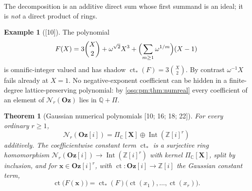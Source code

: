\documentclass[11pt,letterpaper]{article}
\numberwithin{equation}{section}
\newtheorem{theorem}{Theorem}[section]
\theoremstyle{definition}
\newtheorem{example}[example]{Example}
\theoremstyle{remark}
\theoremstyle{plain}
\newcommand{\Oz}{\mathbf{Oz}}
\newcommand{\GOz}{\Oz[i]}
\newcommand{\Z}{\mathbb Z}
\newcommand{\Q}{\mathbb Q}
\newcommand{\C}{\mathbb C}
\newcommand{\ct}{\operatorname{ct}}
\newcommand{\Int}{\operatorname{Int}}
\newcommand{\Num}{\mathscr N}
\newcommand{\src}[1]{\textup{\textsf{[#1]}}}
\begin{document}
The decomposition is an additive direct sum whose first summand is an ideal; it is
\emph{not} a direct product of rings.

\begin{example}[\src{10}]\label{osq:pm:ex:numreal}
The polynomial
\[
 F(X)=3\binom X2+\omega^{\sqrt2}X^3+\Bigl(\sum_{m\ge1}\omega^{1/m}\Bigr)(X-1)
\]
is omnific-integer valued and has shadow $\ct_*(F)=3\binom X2$. By contrast
$\omega^{-1}X$ fails already at $X=1$. No negative-exponent coefficient can be hidden in a
finite-degree lattice-preserving polynomial: by \cref{osq:pm:thm:numreal} every
coefficient of an element of $\Num_r(\Oz)$ lies in $\Q+\Pi$.
\end{example}

\begin{theorem}[Gaussian numerical polynomials \src{10; 16; 18; 22}]\label{osq:pm:thm:numgaussian}
For every ordinary $r\ge1$,
\begin{equation}\label{osq:pm:eq:gaussiandecomp}
 \Num_r(\GOz)=\Pi_\C[\mathbf X]\oplus\Int(\Z[i]^r)
\end{equation}
additively. The coefficientwise constant term $\ct_*$ is a surjective ring homomorphism
$\Num_r(\GOz)\to\Int(\Z[i]^r)$ with kernel $\Pi_\C[\mathbf X]$, split by inclusion, and
for $\mathbf x\in\GOz^r$, with $\ct:\GOz\to\Z[i]$ the Gaussian constant term,
\begin{equation}\label{osq:pm:eq:evshadowC}
 \ct\bigl(F(\mathbf x)\bigr)=\ct_*(F)\bigl(\ct(x_1),\dots,\ct(x_r)\bigr).
\end{equation}
\end{theorem}
\end{document}
